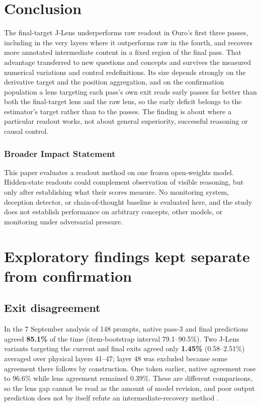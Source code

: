 \section{Conclusion}\label{conclusion}

The final-target J-Lens underperforms raw readout in Ouro's first three
passes, including in the very layers where it outperforms raw in the
fourth, and recovers more annotated intermediate content in a fixed
region of the final pass. That advantage transferred to new questions
and concepts and survives the measured numerical variations and control
redefinitions. Its size depends strongly on the derivative target and
the position aggregation, and on the confirmation population a lens
targeting each pass's own exit reads early passes far better than both
the final-target lens and the raw lens, so the early deficit belongs to
the estimator's target rather than to the passes. The finding is about
where a particular readout works, not about general superiority,
successful reasoning or causal control.

\subsubsection*{Broader Impact Statement}
This paper evaluates a readout method on one frozen open-weights model. Hidden-state readouts could complement observation of visible reasoning, but only after establishing what their scores measure. No monitoring system, deception detector, or chain-of-thought baseline is evaluated here, and the study does not establish performance on arbitrary concepts, other models, or monitoring under adversarial pressure.




\appendix
\section{Exploratory findings kept separate from confirmation}\label{app:A}

\subsection{Exit disagreement}\label{exit-disagreement}

In the 7 September analysis of 148 prompts, native pass-3 and final
predictions agreed \textbf{85.1\%} of the time (item-bootstrap interval
79.1--90.5\%). Two J-Lens variants targeting the current and final exits
agreed only \textbf{1.45\%} (0.58--2.51\%) averaged over physical layers
41--47; layer 48 was excluded because some agreement there follows by
construction. One token earlier, native agreement rose to 96.6\% while
lens agreement remained 0.39\%. These are different comparisons, so the
lens gap cannot be read as the amount of model revision, and poor output
prediction does not by itself refute an intermediate-recovery method
\citep{gurnee2026workspace}.


